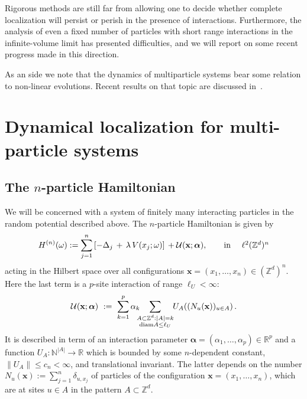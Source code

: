 \documentclass[reqno,keywordsasfootnote]{article}
\numberwithin{equation}{section}
\theoremstyle{definition}
\begin{document}
Rigorous methods  are still  far from allowing one to decide whether complete localization will persist or perish in the presence of interactions.  
Furthermore,  the analysis of even  a fixed number of particles with short range interactions in the infinite-volume limit has presented difficulties, and we will
report on some recent progress \cite{ChSu3,CS09,AW09} made in this direction. 

As an side we note  that  the  dynamics of multiparticle systems bear some relation   to non-linear evolutions.  Recent results on that topic  are discussed in~\cite{WZ}. 

\section{Dynamical localization for multi-particle systems} 
\subsection{The $ n $-particle Hamiltonian}
We will be concerned with a system of finitely  many interacting particles in the random potential described above. 
The $ n $-particle Hamiltonian is given by 
\begin{equation}\label{eq:defHm}
H^{(n)}(\omega) := \sum_{j=1}^n \left[- \Delta_j \, + \, \lambda \, V(x_j;\omega) \right]\, + {\mathcal U}({\mathbf{x}};{\boldsymbol{\alpha}}) , \qquad 
\mbox{in \quad $ \ell^2(\mathbb{Z}^d)^n $} 
\end{equation}
acting in the Hilbert space over all configurations $ {\mathbf{x}} =(x_1, \dots, x_n) \in (\mathbb{Z}^d)^n $. 
Here the last term is a $ p $-site interaction of range $ \ell_U < \infty $:
$${\mathcal U}({\mathbf{x}};{\boldsymbol{\alpha}})  \ :=\ \sum_{k=1}^{p}  \alpha_k  \mkern-10mu \sum_{
\substack{ 
A\subset { {\mathbb Z} }^d:  |A|=k \\ 
{\rm diam}A \le \ell_U
}  }  \mkern-5mu   U_A( (N_{u}({\mathbf{x}}))_{u\in A})  \, . 
$$
It is described in term of an interaction parameter $ {\boldsymbol{\alpha}} = (\alpha_1,\dots,\alpha_p) \in {\mathbb{R}}^p$ and a function
 $ U_A : \mathbb{N}^{|A|} \to {\mathbb{R}} $ which is bounded by some $n$-dependent constant, $ \| U_A \| \leq c_n < \infty$,  and translational invariant. The latter 
depends on the number $N_{u}({\mathbf{x}}) := \sum_{j=1}^n \delta_{u,x_j} $ of particles of the configuration $ {\mathbf{x}} =(x_1, \dots, x_n) $, which are at sites $ u \in A$ 
in the pattern $A \subset { {\mathbb Z} }^d $. 
\end{document}
